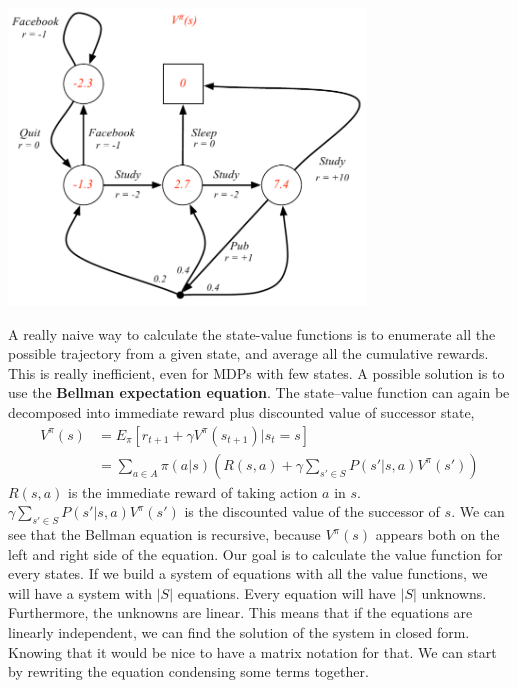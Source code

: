 \documentclass[main.tex]{subfiles}
\begin{document}
\begin{center}
    \includegraphics[width=95mm]{img/MDP_ValueFunction.PNG}
\end{center}
A really naive way to calculate the state-value functions is to enumerate all the possible trajectory from a given state, and average all the cumulative rewards. This is really inefficient, even for MDPs with few states. A possible solution is to use the \textbf{Bellman expectation equation}. The state–value function can again be decomposed into immediate reward plus discounted value of successor state,
\begin{align*}
    V^{\pi}(s) &= E_{\pi}[r_{t+1} + \gamma V^{\pi}(s_{t+1})|s_t=s] \\
    &= \sum_{a\in A} \pi(a|s)(R(s,a) + \gamma \sum_{s' \in S}P(s'|s,a)V^{\pi}(s'))
\end{align*}
$R(s,a)$ is the immediate reward of taking action $a$ in $s$. $\gamma \sum_{s' \in S} P(s'|s,a)V^{\pi}(s')$ is the discounted value of the successor of $s$. 
We can see that the Bellman equation is recursive, because $V^{\pi}(s)$ appears both on the left and right side of the equation\footnotemark.
Our goal is to calculate the value function for every states. If we build a system of equations with all the value functions, we will have a system with $|S|$ equations. Every equation will have $|S|$ unknowns. Furthermore, the unknowns are linear. This means that if the equations are linearly independent, we can find the solution of the system in closed form. Knowing that it would be nice to have a matrix notation for that.
We can start by rewriting the equation condensing some terms together.
\end{document}
